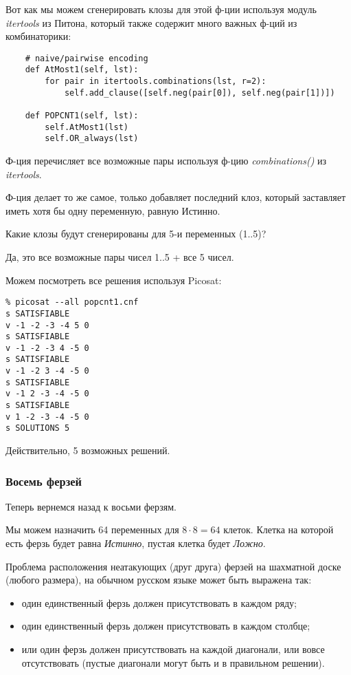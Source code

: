 Вот как мы можем сгенерировать клозы для этой ф-ции используя модуль \textit{itertools} из Питона,
который также содержит много важных ф-ций из комбинаторики:

\begin{lstlisting}
    # naive/pairwise encoding   
    def AtMost1(self, lst):
        for pair in itertools.combinations(lst, r=2):
            self.add_clause([self.neg(pair[0]), self.neg(pair[1])])
        
    def POPCNT1(self, lst):
        self.AtMost1(lst)
        self.OR_always(lst)
\end{lstlisting}

Ф-ция  перечисляет все возможные пары используя ф-цию \textit{combinations()} из
\textit{itertools}.

Ф-ция  делает то же самое, только добавляет последний клоз, который заставляет иметь хотя бы одну
переменную, равную Истинно.

Какие клозы будут сгенерированы для 5-и переменных (1..5)?



Да, это все возможные пары чисел 1..5 + все 5 чисел.

Можем посмотреть все решения используя Picosat:

\begin{lstlisting}
% picosat --all popcnt1.cnf
s SATISFIABLE
v -1 -2 -3 -4 5 0
s SATISFIABLE
v -1 -2 -3 4 -5 0
s SATISFIABLE
v -1 -2 3 -4 -5 0
s SATISFIABLE
v -1 2 -3 -4 -5 0
s SATISFIABLE
v 1 -2 -3 -4 -5 0
s SOLUTIONS 5
\end{lstlisting}

Действительно, 5 возможных решений.

\subsubsection{Восемь ферзей}

Теперь вернемся назад к восьми ферзям.

Мы можем назначить 64 переменных для $8 \cdot 8=64$ клеток.
Клетка на которой есть ферзь будет равна \textit{Истинно}, пустая клетка будет \textit{Ложно}.

Проблема расположения неатакующих (друг друга) ферзей на шахматной доске (любого размера), на обычном русском
языке может быть выражена так:

\begin{itemize}
\item один единственный ферзь должен присутствовать в каждом ряду;

\item один единственный ферзь должен присутствовать в каждом столбце;

\item или один ферзь должен присутствовать на каждой диагонали, или вовсе отсутствовать (пустые диагонали могут быть
и в правильном решении).
\end{itemize}

